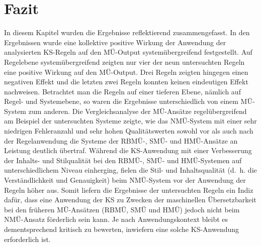 \section{\label{sec:6.5}Fazit}

In diesem Kapitel wurden die Ergebnisse reflektierend zusammengefasst. In den Ergebnissen wurde eine kollektive positive Wirkung der Anwendung der analysierten KS-Regeln auf den MÜ-Output systemübergreifend festgestellt. Auf Regelebene systemübergreifend zeigten nur vier der neun untersuchten Regeln eine positive Wirkung auf den MÜ-Output. Drei Regeln zeigten hingegen einen negativen Effekt und die letzten zwei Regeln konnten keinen eindeutigen Effekt nachweisen. Betrachtet man die Regeln auf einer tieferen Ebene, nämlich auf Regel- und Systemebene, so waren die Ergebnisse unterschiedlich von einem MÜ-System zum anderen. Die Vergleichsanalyse der MÜ-Ansätze regelübergreifend am Beispiel der untersuchten Systeme zeigte, wie das NMÜ-System mit einer sehr niedrigen Fehleranzahl und sehr hohen Qualitätswerten sowohl vor als auch nach der Regelanwendung die Systeme der RBMÜ-, SMÜ- und HMÜ-Ansätze an Leistung deutlich übertraf. Während die KS-Anwendung mit einer Verbesserung der Inhalts- und Stilqualität bei den RBMÜ-, SMÜ- und HMÜ-Systemen auf unterschiedlichem Niveau einherging, fielen die Stil- und Inhaltsqualität (d.~h. die Verständlichkeit und Genauigkeit) beim NMÜ-System vor der Anwendung der Regeln höher aus. Somit liefern die Ergebnisse der untersuchten Regeln ein Indiz dafür, dass eine Anwendung der KS zu Zwecken der maschinellen Übersetzbarkeit bei den früheren MÜ-Ansätzen (RBMÜ, SMÜ und HMÜ) jedoch nicht beim NMÜ-Ansatz förderlich sein kann. Je nach Anwendungskontext bleibt es dementsprechend kritisch zu bewerten, inwiefern eine solche KS-Anwendung erforderlich ist.
